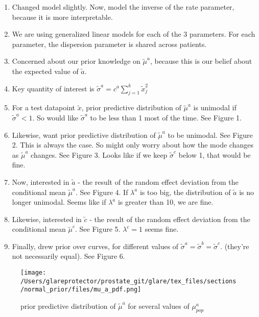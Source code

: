 \documentclass[a4paper,10pt]{article}
\begin{document}
\begin{enumerate}

\item Changed model slightly.  Now, model the inverse of the rate parameter, because it is more interpretable.

\item We are using generalized linear models for each of the 3 parameters.  For each parameter, the dispersion parameter is shared across patients.

\item Concerned about our prior knowledge on $\tilde{\mu}^a$, because this is our belief about the expected value of $\tilde{a}$.  

\item Key quantity of interest is $\tilde{\sigma}^a = c^a\sum_{j=1}^k \tilde{x}_j^2$

\item For a test datapoint $\tilde{x}$, prior predictive distribution of $\tilde{\mu}^a$ is unimodal if $\tilde{\sigma}^a < 1$.  So would like $\tilde{\sigma}^a$ to be less than 1 most of the time.  See Figure 1.

\item Likewise, want prior predictive distribution of $\tilde{\mu}^a$ to be unimodal.  See Figure 2.  This is always the case.  So might only worry about how the mode changes as $\tilde{\mu}^a$ changes.  See Figure 3.  Looks like if we keep $\tilde{\sigma}^c$ below 1, that would be fine.

\item  Now, interested in $\tilde{a}$ - the result of the random effect deviation from the conditional mean $\tilde{\mu}^a$.  See Figure 4.  If $\lambda^a$ is too big, the distribution of $\tilde{a}$ is no longer unimodal.  Seems like if $\lambda^a$ is greater than 10, we are fine.

\item  Likewise, interested in $\tilde{c}$ - the result of the random effect deviation from the conditional mean $\tilde{\mu}^c$.  See Figure 5.  $\lambda^c = 1$ seems fine.

\item  Finally, drew prior over curves, for different values of $\tilde{\sigma}^a=\tilde{\sigma}^b=\tilde{\sigma}^c$.  (they're not necessarily equal).  See Figure 6.


\end{enumerate}




\begin{figure}
\begin{center}
\texttt{[image: /Users/glareprotector/prostate\_git/glare/tex\_files/sections/normal\_prior/files/mu\_a\_pdf.png]}
\caption{prior predictive distribution of $\tilde{\mu}^a$ for several values of $\mu_{pop}^a$}
\end{center}
\end{figure}
\end{document}

